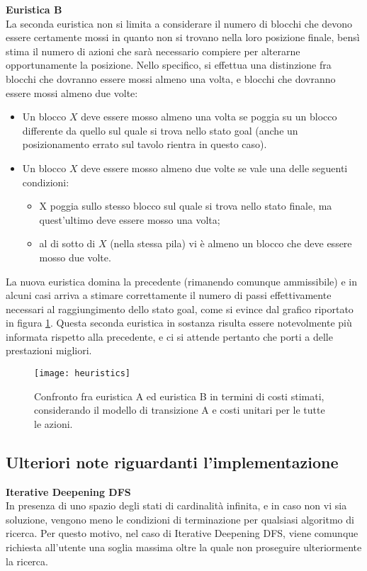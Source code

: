 \noindent\textbf{Euristica B}\\
La seconda euristica non si limita a considerare il numero di blocchi che devono essere certamente mossi in quanto non si trovano nella loro posizione finale, bensì stima il numero di azioni che sarà necessario compiere per alterarne opportunamente la posizione. Nello specifico, si effettua una distinzione fra blocchi che dovranno essere mossi almeno una volta, e blocchi che dovranno essere mossi almeno due volte:
\begin{itemize}
\item Un blocco $X$ deve essere mosso almeno una volta se poggia su un blocco differente da quello sul quale si trova nello stato goal (anche un posizionamento errato sul tavolo rientra in questo caso).
\item Un blocco $X$ deve essere mosso almeno due volte se vale una delle seguenti condizioni:
\begin{itemize}
\item X poggia sullo stesso blocco sul quale si trova nello stato finale, ma quest'ultimo deve essere mosso una volta;
\item al di sotto di $X$ (nella stessa pila) vi è almeno un blocco che deve essere mosso due volte.
\end{itemize}
\end{itemize}
La nuova euristica domina la precedente (rimanendo comunque ammissibile) e in alcuni casi arriva a stimare correttamente il numero di passi effettivamente necessari al raggiungimento dello stato goal, come si evince dal grafico riportato in figura \ref{heuristics}. Questa seconda euristica in sostanza risulta essere notevolmente più informata rispetto alla precedente, e ci si attende pertanto che porti a delle prestazioni migliori.

\begin{figure}[h]
\centering
\texttt{[image: heuristics]}
\caption{Confronto fra euristica A ed euristica B in termini di costi stimati,\\ considerando il modello di transizione A e costi unitari per le tutte le azioni.}
\label{heuristics}
\end{figure}


\subsection{Ulteriori note riguardanti l'implementazione}

\noindent\textbf{Iterative Deepening DFS}\\
In presenza di uno spazio degli stati di cardinalità infinita, e in caso non vi sia soluzione, vengono meno le condizioni di terminazione per qualsiasi algoritmo di ricerca. Per questo motivo, nel caso di Iterative Deepening DFS, viene comunque richiesta all'utente una soglia massima oltre la quale non proseguire ulteriormente la ricerca.\\

